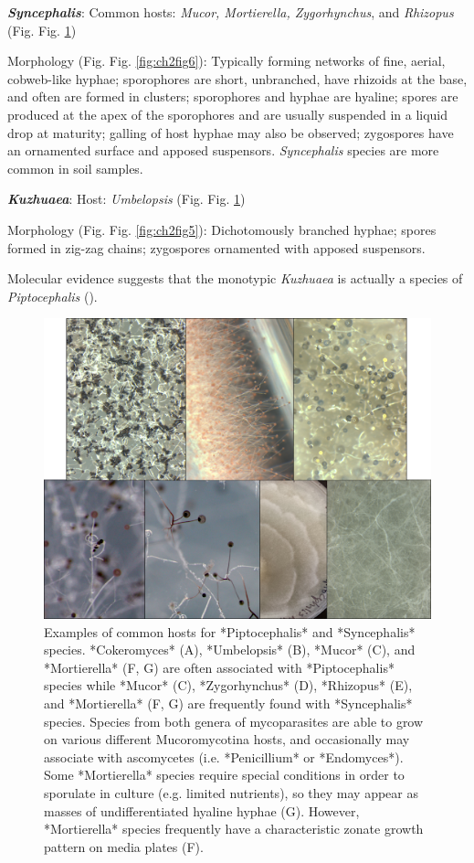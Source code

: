 \documentclass[]{book}
\begin{document}
\textbf{\emph{Syncephalis}}: Common hosts: \emph{Mucor, Mortierella, Zygorhynchus}, and \emph{Rhizopus} (Fig. Fig. \ref{fig:ch2fig4})

Morphology (Fig. Fig. \ref{fig:ch2fig6}): Typically forming networks of fine, aerial, cobweb-like hyphae; sporophores are short, unbranched, have rhizoids at the base, and often are formed in clusters; sporophores and hyphae are hyaline; spores are produced at the apex of the sporophores and are usually suspended in a liquid drop at maturity; galling of host hyphae may also be observed; zygospores have an ornamented surface and apposed suspensors. \emph{Syncephalis} species are more common in soil samples.

\textbf{\emph{Kuzhuaea}}: Host: \emph{Umbelopsis} (Fig. Fig. \ref{fig:ch2fig4})

Morphology (Fig. Fig. \ref{fig:ch2fig5}): Dichotomously branched hyphae; spores formed in zig-zag chains; zygospores ornamented with apposed suspensors.

Molecular evidence suggests that the monotypic \emph{Kuzhuaea} is actually a species of \emph{Piptocephalis} (\citet{White_2006}).

\begin{figure}

{\centering \includegraphics[width=6.83in]{img/Ch2_Fig4} 

}

\caption{Examples of common hosts for *Piptocephalis* and *Syncephalis* species.  *Cokeromyces* (A), *Umbelopsis* (B), *Mucor* (C), and *Mortierella* (F, G) are often associated with *Piptocephalis* species while *Mucor* (C), *Zygorhynchus* (D), *Rhizopus* (E), and *Mortierella* (F, G) are frequently found with *Syncephalis* species.  Species from both genera of mycoparasites are able to grow on various different Mucoromycotina hosts, and occasionally may associate with ascomycetes (i.e. *Penicillium* or *Endomyces*).  Some *Mortierella* species require special conditions in order to sporulate in culture (e.g. limited nutrients), so they may appear as masses of undifferentiated hyaline hyphae (G).  However, *Mortierella* species frequently have a characteristic zonate growth pattern on media plates (F).}\label{fig:ch2fig4}
\end{figure}
\end{document}
